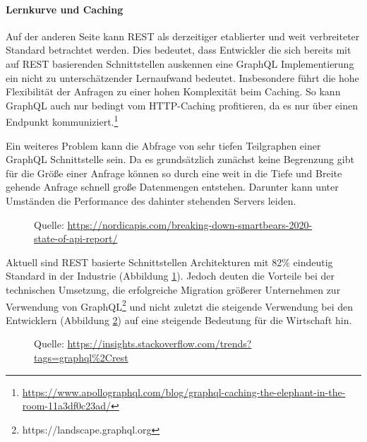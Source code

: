 \documentclass[11pt]{article}
\begin{document}
\paragraph{Lernkurve und Caching}
Auf der anderen Seite kann REST als derzeitiger etablierter und weit verbreiteter Standard betrachtet werden. Dies bedeutet, dass Entwickler die sich bereits mit auf REST basierenden Schnittstellen auskennen eine GraphQL Implementierung ein nicht zu unterschätzender Lernaufwand bedeutet.
 Insbesondere führt die hohe Flexibilität der Anfragen zu einer hohen Komplexität beim Caching. So kann GraphQL auch nur bedingt vom HTTP-Caching profitieren, da es nur über einen Endpunkt kommuniziert.\footnote{\url{https://www.apollographql.com/blog/graphql-caching-the-elephant-in-the-room-11a3df0c23ad/}}


Ein weiteres Problem kann die Abfrage von sehr tiefen Teilgraphen einer GraphQL Schnittstelle sein. Da es grundsätzlich zunächst keine Begrenzung gibt für die Größe einer Anfrage können so durch eine weit in die Tiefe und Breite gehende Anfrage schnell große Datenmengen entstehen. Darunter kann unter Umständen die Performance des dahinter stehenden Servers leiden. 
\begin{figure}[H]
\caption{}
\label{fig:apis}
\centering
%
           {Quelle: \url{https://nordicapis.com/breaking-down-smartbears-2020-state-of-api-report/}}
\end{figure}
 


Aktuell sind REST basierte Schnittstellen Architekturen mit 82\% eindeutig Standard in der Industrie (Abbildung \ref{fig:apis}). Jedoch
deuten die Vorteile bei der technischen Umsetzung, die erfolgreiche Migration größerer Unternehmen zur Verwendung von GraphQL\footnote{https://landscape.graphql.org} und nicht zuletzt die steigende Verwendung bei den Entwicklern (Abbildung \ref{fig:restvsgraphql}) auf eine steigende Bedeutung für die Wirtschaft hin. 

\begin{figure}[H]
\caption{}
\label{fig:restvsgraphql}
\centering
%
           {Quelle: \url{https://insights.stackoverflow.com/trends?tags=graphql\%2Crest}}
\end{figure}
 
\end{document}
